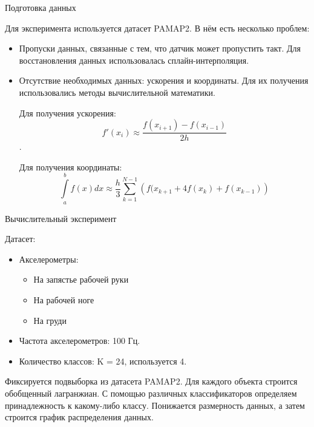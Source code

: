 \documentclass{beamer}
\begin{document}
\begin{frame}{Подготовка данных}

    Для эксперимента используется датасет PAMAP2. В нём есть несколько проблем:
        \begin{itemize}
    
            \item Пропуски данных, связанные с тем, что датчик может пропустить такт. Для восстановления данных использовалась сплайн-интерполяция.

            \item Отсутствие необходимых данных: ускорения и координаты. Для их получения использовались методы вычислительной математики.

            Для получения ускорения:
            $$f'(x_i) \approx \frac{f(x_{i + 1}) - f(x_{i - 1})}{2h}$$.

            Для получения координаты:
            $$\int\limits_a^b f(x) dx \approx \frac{h}{3} \sum\limits_{k = 1}^{N - 1} \left( f(x_{k + 1} + 4f(x_k) + f(x_{k - 1}) \right)$$

        \end{itemize}

\end{frame}


\begin{frame}{Вычислительный эксперимент}

    Датасет:
        \begin{itemize}

            \item Акселерометры:
                    \begin{itemize}

                        \item На запястье рабочей руки

                        \item На рабочей ноге

                        \item На груди

                    \end{itemize}

            \item Частота акселерометров: 100 Гц.
            
            \item Количество классов: K = 24, используется 4.

        \end{itemize}
        
Фиксируется подвыборка из датасета PAMAP2. Для каждого объекта строится обобщенный лагранжиан. С помощью различных классификаторов определяем принадлежность к какому-либо классу.
Понижается размерность данных, а затем строится график распределения данных.

\end{frame}
\end{document}
